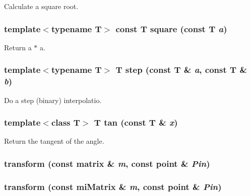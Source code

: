 Calculate a square root. 

\subsubsection{\setlength{\rightskip}{0pt plus 5cm}template$<$typename T$>$ const T square (const T {\em a})\hspace{0.3cm}{\tt  [inline]}}\label{namespacersl_a5}


Return a $\ast$ a. 

\subsubsection{\setlength{\rightskip}{0pt plus 5cm}template$<$typename T$>$ T step (const T \& {\em a}, const T \& {\em b})\hspace{0.3cm}{\tt  [inline]}}\label{namespacersl_a11}


Do a step (binary) interpolatio. 

\subsubsection{\setlength{\rightskip}{0pt plus 5cm}template$<$class T$>$ T tan (const T \& {\em x})\hspace{0.3cm}{\tt  [inline]}}\label{namespacersl_a32}


Return the tangent of the angle. 

\subsubsection{ transform (const matrix \& {\em m}, const point \& {\em Pin})\hspace{0.3cm}{\tt  [inline]}}\label{namespacersl_a149}


\subsubsection{ transform (const mi\-Matrix \& {\em m}, const point \& {\em Pin})\hspace{0.3cm}{\tt  [inline]}}\label{namespacersl_a148}


